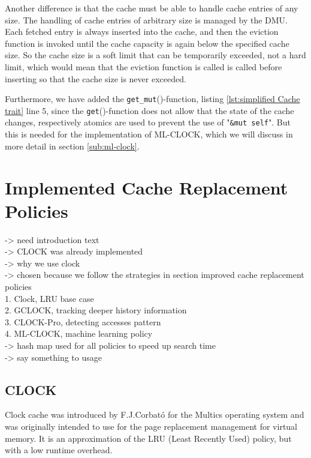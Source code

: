 \documentclass[
	12pt,
	a4paper,
	abstract,
	bibliography=totoc,
	chapterprefix,
	headings=openright,
	numbers=endperiod,
	parskip=half,
	twoside,
]{scrreprt}
\begin{document}
Another difference is that the cache must be able to handle cache entries of any size.
The handling of cache entries of arbitrary size is managed by the DMU.
Each fetched entry is always inserted into the cache, and then the eviction function is invoked until the cache capacity is again below the specified cache size.
So the cache size is a soft limit that can be temporarily exceeded, not a hard limit, which would mean that the eviction function is called
is called before inserting so that the cache size is never exceeded.

Furthermore, we have added the \texttt{get\_mut}()-function, listing \ref{lst:simplified Cache trait} line 5, 
since the \texttt{get}()-function does not allow that the state of the cache changes, respectively atomics are used to prevent the use of "\texttt{\&mut self}".
But this is needed for the implementation of ML-CLOCK, which we will discuss in more detail in section \ref{sub:ml-clock}.

\section{Implemented Cache Replacement Policies}
\label{sec:implemented cache replacement policies}

-> need introduction text\\
-> CLOCK was already implemented\\
-> why we use clock\\
-> chosen because we follow the strategies in section improved cache replacement policies\\
	1. Clock, LRU base case\\
	2. GCLOCK, tracking deeper history information\\
	3. CLOCK-Pro, detecting accesses pattern\\
	4. ML-CLOCK, machine learning policy\\
-> hash map used for all policies to speed up search time\\
-> say something to usage 

\subsection{CLOCK}

Clock cache was introduced by F.J.Corbató \cite{corbato1968paging} for the Multics operating system and was originally intended 
to use for the page replacement management for virtual memory.
It is an approximation of the LRU (Least Recently Used) policy, but with a low runtime overhead.
\end{document}
